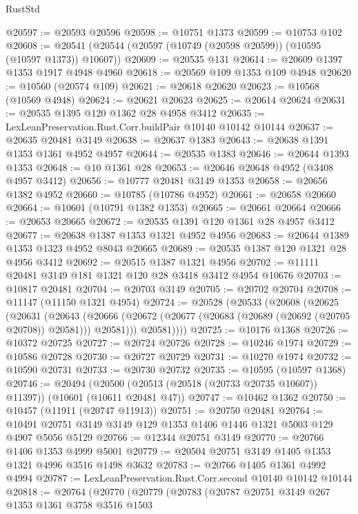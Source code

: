 \begin{lexlean}{RustStd}
\begin{coremodule}
@20597 := @20593 @20596
@20598 := @10751 @1373
@20599 := @10753 @102
@20608 := @20541 (@20544 (@20597 (@10749 (@20598 @20599)) (@10595 (@10597 @1373)) @10607))
@20609 := @20535 @131
@20614 := @20609 @1397 @1353 @1917 @4948 @4960
@20618 := @20569 @109 @1353 @109 @4948
@20620 := @10560 (@20574 @109)
@20621 := @20618 @20620
@20623 := @10568 (@10569 @4948)
@20624 := @20621 @20623
@20625 := @20614 @20624
@20631 := @20535 @1395 @120 @1362 @28 @4958 @3412
@20635 := LexLeanPreservation.Rust.Corr.buildPair @10140 @10142 @10144
@20637 := @20635 @20481 @3149
@20638 := @20637 @1383
@20643 := @20638 @1391 @1353 @1361 @4952 @4957
@20644 := @20535 @1383
@20646 := @20644 @1393 @1353
@20648 := @10 @1361 @28
@20653 := @20646 @20648 @4952 (@3408 @4957 @3412)
@20656 := @10777 @20481 @3149 @1353
@20658 := @20656 @1382 @4952
@20660 := @10785 (@10786 @4952)
@20661 := @20658 @20660
@20664 := @10601 (@10791 @1382 @1353)
@20665 := @20661 @20664
@20666 := @20653 @20665
@20672 := @20535 @1391 @120 @1361 @28 @4957 @3412
@20677 := @20638 @1387 @1353 @1321 @4952 @4956
@20683 := @20644 @1389 @1353 @1323 @4952 @8043 @20665
@20689 := @20535 @1387 @120 @1321 @28 @4956 @3412
@20692 := @20515 @1387 @1321 @4956
@20702 := @11111 @20481 @3149 @181 @1321 @120 @28 @3418 @3412 @4954 @10676
@20703 := @10817 @20481
@20704 := @20703 @3149
@20705 := @20702 @20704
@20708 := @11147 (@11150 @1321 @4954)
@20724 := @20528
    (@20533
      (@20608
        (@20625
          (@20631
            (@20643
              (@20666 (@20672 (@20677 (@20683 (@20689 (@20692 (@20705 @20708)) @20581))) @20581)))
            @20581))))
@20725 := @10176 @1368
@20726 := @10372 @20725
@20727 := @20724 @20726
@20728 := @10246 @1974
@20729 := @10586 @20728
@20730 := @20727 @20729
@20731 := @10270 @1974
@20732 := @10590 @20731
@20733 := @20730 @20732
@20735 := @10595 (@10597 @1368)
@20746 := @20494
    (@20500 (@20513 (@20518 (@20733 @20735 @10607)) @11397))
    (@10601 (@10611 @20481 @47))
@20747 := @10462 @1362
@20750 := @10457 (@11911 (@20747 @11913))
@20751 := @20750 @20481
@20764 := @10491 @20751 @3149 @3149 @129 @1353 @1406 @1446 @1321 @5003 @129 @4907 @5056 @5129
@20766 := @12344 @20751 @3149
@20770 := @20766 @1406 @1353 @4999 @5001
@20779 := @20504 @20751 @3149 @1405 @1353 @1321 @4996 @3516 @1498 @3632
@20783 := @20766 @1405 @1361 @4992 @4994
@20787 := LexLeanPreservation.Rust.Corr.second @10140 @10142 @10144
@20818 := @20764
    (@20770
      (@20779
        (@20783
          (@20787
            @20751
            @3149
            @267
            @1353
            @1361
            @3758
            @3516
            @1503

\end{coremodule}
\end{lexlean}
